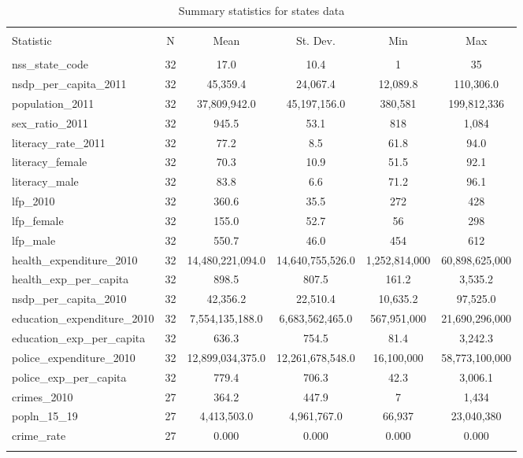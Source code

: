 
\begin{table}[!htbp] \centering 
  \caption{Summary statistics for states data} 
  \label{} 
\begin{tabular}{@{\extracolsep{5pt}}lccccc} 
\\[-1.8ex]\hline 
\hline \\[-1.8ex] 
Statistic & \multicolumn{1}{c}{N} & \multicolumn{1}{c}{Mean} & \multicolumn{1}{c}{St. Dev.} & \multicolumn{1}{c}{Min} & \multicolumn{1}{c}{Max} \\ 
\hline \\[-1.8ex] 
nss\_state\_code & 32 & 17.0 & 10.4 & 1 & 35 \\ 
nsdp\_per\_capita\_2011 & 32 & 45,359.4 & 24,067.4 & 12,089.8 & 110,306.0 \\ 
population\_2011 & 32 & 37,809,942.0 & 45,197,156.0 & 380,581 & 199,812,336 \\ 
sex\_ratio\_2011 & 32 & 945.5 & 53.1 & 818 & 1,084 \\ 
literacy\_rate\_2011 & 32 & 77.2 & 8.5 & 61.8 & 94.0 \\ 
literacy\_female & 32 & 70.3 & 10.9 & 51.5 & 92.1 \\ 
literacy\_male & 32 & 83.8 & 6.6 & 71.2 & 96.1 \\ 
lfp\_2010 & 32 & 360.6 & 35.5 & 272 & 428 \\ 
lfp\_female & 32 & 155.0 & 52.7 & 56 & 298 \\ 
lfp\_male & 32 & 550.7 & 46.0 & 454 & 612 \\ 
health\_expenditure\_2010 & 32 & 14,480,221,094.0 & 14,640,755,526.0 & 1,252,814,000 & 60,898,625,000 \\ 
health\_exp\_per\_capita & 32 & 898.5 & 807.5 & 161.2 & 3,535.2 \\ 
nsdp\_per\_capita\_2010 & 32 & 42,356.2 & 22,510.4 & 10,635.2 & 97,525.0 \\ 
education\_expenditure\_2010 & 32 & 7,554,135,188.0 & 6,683,562,465.0 & 567,951,000 & 21,690,296,000 \\ 
education\_exp\_per\_capita & 32 & 636.3 & 754.5 & 81.4 & 3,242.3 \\ 
police\_expenditure\_2010 & 32 & 12,899,034,375.0 & 12,261,678,548.0 & 16,100,000 & 58,773,100,000 \\ 
police\_exp\_per\_capita & 32 & 779.4 & 706.3 & 42.3 & 3,006.1 \\ 
crimes\_2010 & 27 & 364.2 & 447.9 & 7 & 1,434 \\ 
popln\_15\_19 & 27 & 4,413,503.0 & 4,961,767.0 & 66,937 & 23,040,380 \\ 
crime\_rate & 27 & 0.000 & 0.000 & 0.000 & 0.000 \\ 
\hline \\[-1.8ex] 
\end{tabular} 
\end{table} 
